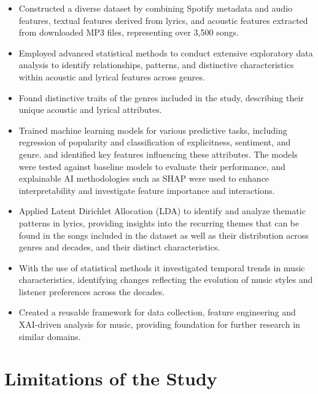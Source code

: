 \begin{itemize}
  \item Constructed a diverse dataset by combining Spotify metadata and audio
    features, textual features derived from lyrics, and acoustic features
    extracted from downloaded MP3 files, representing over 3,500 songs.

  \item Employed advanced statistical methods to conduct extensive exploratory
    data analysis to identify relationships, patterns, and distinctive
    characteristics within acoustic and lyrical features across genres.

  \item Found distinctive traits of the genres included in the study,
    describing their unique acoustic and lyrical attributes.

  \item Trained machine learning models for various predictive tasks, including
    regression of popularity and  classification of explicitness, sentiment,
    and genre. and identified key features influencing these attributes. The
    models were tested against baseline models to evaluate their performance,
    and explainable AI methodologies such as SHAP were used to enhance
    interpretability and investigate feature importance and interactions.

  \item Applied Latent Dirichlet Allocation (LDA) to identify and analyze
    thematic patterns in lyrics, providing insights into the recurring themes
    that can be found in the songs included in the dataset as well as their
    distribution across genres and decades, and their distinct characteristics.

  \item With the use of statistical methods it investigated temporal trends in
    music characteristics, identifying changes reflecting the evolution of
    music styles and listener preferences across the decades.

  \item Created a reusable framework for data collection, feature engineering
    and XAI-driven analysis for music, providing foundation for further
    research in similar domains.
\end{itemize}






\section{Limitations of the Study}
\label{sec:limitations}

